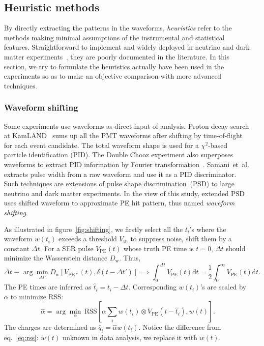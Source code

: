 \subsection{Heuristic methods}
By directly extracting the patterns in the waveforms, \textit{heuristics} refer to the methods making minimal assumptions of the instrumental and statistical features.  Straightforward to implement and widely deployed in neutrino and dark matter experiments~\cite{students22}, they are poorly documented in the literature.  In this section, we try to formulate the heuristics actually have been used in the experiments so as to make an objective comparison with more advanced techniques.

\subsubsection{Waveform shifting}
\label{sec:shifting}
Some experiments use waveforms as direct input of analysis. Proton decay search at KamLAND~\cite{kamland_collaboration_search_2015} sums up all the PMT waveforms after shifting by time-of-flight for each event candidate.  The total waveform shape is used for a $\chi^2$-based particle identification (PID). The Double Chooz experiment also superposes waveforms to extract PID information by Fourier transformation~\cite{chooz_2018}. Samani~et~al.\cite{samani_pulse_2020} extracts pulse width from a raw waveform and use it as a PID discriminator.  Such techniques are extensions of pulse shape discrimination~(PSD) to large neutrino and dark matter experiments.  In the view of this study, extended PSD uses shifted waveform to approximate PE hit pattern, thus named \textit{waveform shifting}.

As illustrated in figure~\ref{fig:shifting}, we firstly select all the $t_i$'s where the waveform $w(t_i)$ exceeds a threshold $V_\mathrm{th}$ to suppress noise, shift them by a constant $\Delta t$. For a SER pulse $V_\mathrm{PE}(t)$ whose truth PE time is $t=0$, $\Delta t$ should minimize the Wasserstein distance $D_\mathrm{w}$. Thus,
\begin{equation}
    \Delta t \equiv \arg\underset{\Delta t'}{\min} D_\mathrm{w}\left[ V_\mathrm{PE*}(t), \delta(t-\Delta t') \right] \implies \int_{0}^{\Delta t} V_\mathrm{PE}(t) \mathrm{d}t = \frac{1}{2} \int_{0}^{\infty} V_\mathrm{PE}(t) \mathrm{d}t.
  \label{eq:waveform-shift-dt}
\end{equation}
The PE times are inferred as $\hat{t}_i = t_i - \Delta t$.  Corresponding $w(t_i)$'s are scaled by $\alpha$ to minimize RSS:
\begin{equation}
  \hat{\alpha} = \arg\underset{\alpha}{\min}~\mathrm{RSS}\left[ \alpha \sum_iw(t_i) \otimes V_\mathrm{PE}(t-\hat{t}_i), w(t) \right] .
  \label{eq:alpha}
\end{equation}
The charges are determined as $\hat{q}_i = \hat{\alpha} w(t_i)$.  Notice the difference from eq.~\eqref{eq:rss}: $\tilde{w}(t)$ unknown in data analysis, we replace it with $w(t)$.

